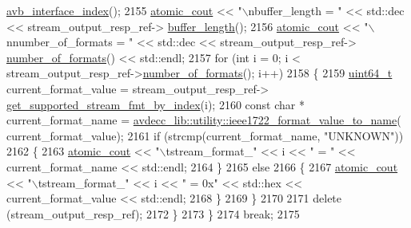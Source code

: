\begin{DoxyCode}
      \hyperlink{classavdecc__lib_1_1stream__output__descriptor__response_a8a84689147c9ee2278a6d3692b1c5bb1}{avb\_interface\_index}();
2155             \hyperlink{cmd__line_8h_a0bc38ccc65c79ba06c6fcd7b4bf554c3}{atomic\_cout} << \textcolor{stringliteral}{"\(\backslash\)nbuffer\_length = "} << std::dec << stream\_output\_resp\_ref->
      \hyperlink{classavdecc__lib_1_1stream__output__descriptor__response_a659139f2462ec36f08178dff106e184d}{buffer\_length}();
2156             \hyperlink{cmd__line_8h_a0bc38ccc65c79ba06c6fcd7b4bf554c3}{atomic\_cout} << \textcolor{stringliteral}{"\(\backslash\)nnumber\_of\_formats = "} << std::dec << stream\_output\_resp\_ref->
      \hyperlink{classavdecc__lib_1_1stream__output__descriptor__response_a55d221ca29bf6acce7d7031b811bae01}{number\_of\_formats}() << std::endl;
2157             \textcolor{keywordflow}{for} (\textcolor{keywordtype}{int} i = 0; i < stream\_output\_resp\_ref->\hyperlink{classavdecc__lib_1_1stream__output__descriptor__response_a55d221ca29bf6acce7d7031b811bae01}{number\_of\_formats}(); i++)
2158             \{
2159                 \hyperlink{parse_8c_aec6fcb673ff035718c238c8c9d544c47}{uint64\_t} current\_format\_value = stream\_output\_resp\_ref->
      \hyperlink{classavdecc__lib_1_1stream__output__descriptor__response_a4e92ab02c01dc1343a66d43403e470a3}{get\_supported\_stream\_fmt\_by\_index}(i);
2160                 \textcolor{keyword}{const} \textcolor{keywordtype}{char} * current\_format\_name = 
      \hyperlink{namespaceavdecc__lib_1_1utility_a65f055a50d3d236b67d30c1a7b8425c8}{avdecc\_lib::utility::ieee1722\_format\_value\_to\_name}(
      current\_format\_value);
2161                 \textcolor{keywordflow}{if} (strcmp(current\_format\_name, \textcolor{stringliteral}{"UNKNOWN"}))
2162                 \{
2163                     \hyperlink{cmd__line_8h_a0bc38ccc65c79ba06c6fcd7b4bf554c3}{atomic\_cout} << \textcolor{stringliteral}{"\(\backslash\)tstream\_format\_"} << i << \textcolor{stringliteral}{" = "} << current\_format\_name << 
      std::endl;
2164                 \}
2165                 \textcolor{keywordflow}{else}
2166                 \{
2167                     \hyperlink{cmd__line_8h_a0bc38ccc65c79ba06c6fcd7b4bf554c3}{atomic\_cout} << \textcolor{stringliteral}{"\(\backslash\)tstream\_format\_"} << i << \textcolor{stringliteral}{" = 0x"} << std::hex << 
      current\_format\_value << std::endl;
2168                 \}
2169             \}
2170 
2171             \textcolor{keyword}{delete} (stream\_output\_resp\_ref);
2172         \}
2173     \}
2174     \textcolor{keywordflow}{break};
2175 

\end{DoxyCode}
